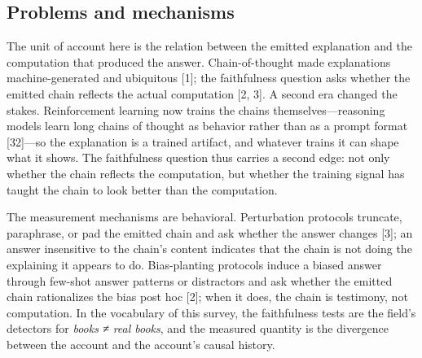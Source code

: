 \documentclass[11pt]{article}
\begin{document}
\subsection{Problems and mechanisms}
\noindent The unit of account here is the relation between the emitted explanation and the computation that produced the answer. Chain-of-thought made explanations machine-generated and ubiquitous [1]; the faithfulness question asks whether the emitted chain reflects the actual computation [2, 3]. A second era changed the stakes. Reinforcement learning now trains the chains themselves—reasoning models learn long chains of thought as behavior rather than as a prompt format [32]—so the explanation is a trained artifact, and whatever trains it can shape what it shows. The faithfulness question thus carries a second edge: not only whether the chain reflects the computation, but whether the training signal has taught the chain to look better than the computation.\par
\noindent The measurement mechanisms are behavioral. Perturbation protocols truncate, paraphrase, or pad the emitted chain and ask whether the answer changes [3]; an answer insensitive to the chain's content indicates that the chain is not doing the explaining it appears to do. Bias-planting protocols induce a biased answer through few-shot answer patterns or distractors and ask whether the emitted chain rationalizes the bias post hoc [2]; when it does, the chain is testimony, not computation. In the vocabulary of this survey, the faithfulness tests are the field's detectors for \emph{books ≠ real books}, and the measured quantity is the divergence between the account and the account's causal history.\par
\end{document}

